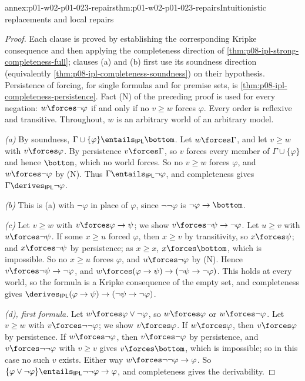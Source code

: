 \begin{annexitem}{annex:p01-w02-p01-023-repairs}{thm:p01-w02-p01-023-repairs}{Intuitionistic replacements and local repairs}
\begin{proof}
Each clause is proved by establishing the corresponding Kripke consequence
and then applying the completeness direction of
\cref{thm:p08-ipl-strong-completeness-full}; clauses (a) and (b) first use
its soundness direction (equivalently
\cref{thm:p08-ipl-completeness-soundness}) on their hypothesis. Persistence
of forcing, for single formulas and for premise sets, is
\cref{thm:p08-ipl-completeness-persistence}. Fact (N) of the preceding proof
is used for every negation: \(w\forces\neg\varphi\) if and only if no
\(v\geq w\) forces \(\varphi\). Every order is reflexive and transitive.
Throughout, \(w\) is an arbitrary world of an arbitrary model.

\emph{(a)} By soundness, \(\Gamma\cup\{\varphi\}\entails_{\mathsf{IPL}}\bottom\).
Let \(w\forces\Gamma\), and let \(v\geq w\) with \(v\forces\varphi\). By
persistence \(v\forces\Gamma\), so \(v\) forces every member of
\(\Gamma\cup\{\varphi\}\) and hence \(\bottom\), which no world forces. So
no \(v\geq w\) forces \(\varphi\), and \(w\forces\neg\varphi\) by (N). Thus
\(\Gamma\entails_{\mathsf{IPL}}\neg\varphi\), and completeness gives
\(\Gamma\derives_{\mathsf{IPL}}\neg\varphi\).

\emph{(b)} This is (a) with \(\neg\varphi\) in place of \(\varphi\), since
\(\neg\neg\varphi\) is \(\neg\varphi\to\bottom\).

\emph{(c)} Let \(v\geq w\) with \(v\forces\varphi\to\psi\); we show
\(v\forces\neg\psi\to\neg\varphi\). Let \(u\geq v\) with
\(u\forces\neg\psi\). If some \(x\geq u\) forced \(\varphi\), then
\(x\geq v\) by transitivity, so \(x\forces\psi\); and \(x\forces\neg\psi\)
by persistence; as \(x\geq x\), \(x\forces\bottom\), which is impossible.
So no \(x\geq u\) forces \(\varphi\), and \(u\forces\neg\varphi\) by (N).
Hence \(v\forces\neg\psi\to\neg\varphi\), and
\(w\forces(\varphi\to\psi)\to(\neg\psi\to\neg\varphi)\). This holds at
every world, so the formula is a Kripke consequence of the empty set, and
completeness gives
\(\derives_{\mathsf{IPL}}(\varphi\to\psi)\to(\neg\psi\to\neg\varphi)\).

\emph{(d), first formula.} Let \(w\forces\varphi\lor\neg\varphi\), so
\(w\forces\varphi\) or \(w\forces\neg\varphi\). Let \(v\geq w\) with
\(v\forces\neg\neg\varphi\); we show \(v\forces\varphi\). If
\(w\forces\varphi\), then \(v\forces\varphi\) by persistence. If
\(w\forces\neg\varphi\), then \(v\forces\neg\varphi\) by persistence, and
\(v\forces\neg\neg\varphi\) with \(v\geq v\) gives \(v\forces\bottom\),
which is impossible; so in this case no such \(v\) exists. Either way
\(w\forces\neg\neg\varphi\to\varphi\). So
\(\{\varphi\lor\neg\varphi\}\entails_{\mathsf{IPL}}\neg\neg\varphi\to\varphi\),
and completeness gives the derivability.


\end{proof}
\end{annexitem}
